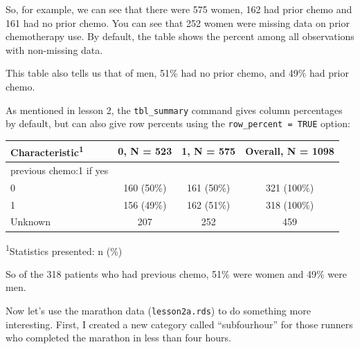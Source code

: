 \documentclass[]{book}
\newenvironment{Shaded}{\begin{snugshade}}{\end{snugshade}}
\newcommand{\DataTypeTok}[1]{\textcolor[rgb]{0.13,0.29,0.53}{#1}}
\newcommand{\KeywordTok}[1]{\textcolor[rgb]{0.13,0.29,0.53}{\textbf{#1}}}
\newcommand{\NormalTok}[1]{#1}
\newcommand{\OperatorTok}[1]{\textcolor[rgb]{0.81,0.36,0.00}{\textbf{#1}}}
\newcommand{\OtherTok}[1]{\textcolor[rgb]{0.56,0.35,0.01}{#1}}
\newcommand{\StringTok}[1]{\textcolor[rgb]{0.31,0.60,0.02}{#1}}
\begin{document}
So, for example, we can see that there were 575 women, 162 had prior chemo and 161 had no prior chemo. You can see that 252 women were missing data on prior chemotherapy use. By default, the table shows the percent among all observations with non-missing data.

This table also tells us that of men, 51\% had no prior chemo, and 49\% had prior chemo.

As mentioned in lesson 2, the \texttt{tbl\_summary} command gives column percentages by default, but can also give row percents using the \texttt{row\_percent\ =\ TRUE} option:

\begin{Shaded}
\end{Shaded}

\captionsetup[table]{labelformat=empty,skip=1pt}
\begin{longtable}{lccc}
\toprule
\textbf{Characteristic}\textsuperscript{1} & \textbf{0}, N = 523 & \textbf{1}, N = 575 & \textbf{Overall}, N = 1098 \\ 
\midrule
previous chemo:1 if yes &  &  &  \\ 
0 & 160 (50\%) & 161 (50\%) & 321 (100\%) \\ 
1 & 156 (49\%) & 162 (51\%) & 318 (100\%) \\ 
Unknown & 207 & 252 & 459 \\ 
\bottomrule
\end{longtable}
\vspace{-5mm}
\begin{minipage}{\linewidth}
\textsuperscript{1}Statistics presented: n (\%) \\ 
\end{minipage}

So of the 318 patients who had previous chemo, 51\% were women and 49\% were men.

Now let's use the marathon data (\texttt{lesson2a.rds}) to do something more interesting. First, I created a new category called ``subfourhour'' for those runners who completed the marathon in less than four hours.
\end{document}
